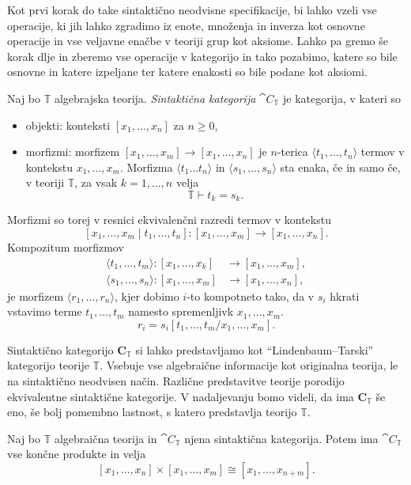 \documentclass[../kategoricna_logika.tex]{subfiles}
\begin{document}
Kot prvi korak do take sintaktično neodvisne specifikacije,
bi lahko vzeli vse operacije, ki jih lahko zgradimo iz
enote, množenja in inverza kot osnovne operacije in vse
veljavne enačbe v teoriji grup kot aksiome. Lahko pa gremo še korak dlje
in zberemo vse operacije v kategorijo in tako pozabimo, katere so bile
osnovne in katere izpeljane ter katere enakosti so bile podane kot aksiomi.
%
\begin{definicija}
  Naj bo $\mathbb{T}$ algebrajska teorija.
  \emph{Sintaktična kategorija} $\cat{C}_\mathbb{T}$ je kategorija,
  v kateri so
  \begin{itemize}
  \item objekti: konteksti $[x_1, \ldots, x_n]$ za $n \geq 0$,
%
  \item morfizmi: morfizem $[x_1, \ldots, x_m] \to [x_1, \ldots, x_n]$
    je $n$-terica $\langle t_1, \ldots, t_n \rangle$ termov v kontekstu
    $x_1, \ldots, x_m$. Morfizma $\langle t_1 \ldots t_n \rangle$ in
    $\langle s_1, \ldots, s_n \rangle$ sta enaka, če in samo če,
    v teoriji $\mathbb{T}$, za vsak $k = 1, \ldots, n$ velja
    $$\mathbb{T} \vdash t_k = s_k.$$
\end{itemize}
%
Morfizmi so torej v resnici ekvivalenčni razredi termov v kontekstu
$$[x_1, \ldots, x_m \mid t_1, \ldots, t_n] : [x_1, \ldots, x_m] \to [x_1, \ldots, x_n].$$
%
Kompozitum morfizmov
  \begin{align*}
    \langle t_1, \ldots, t_m \rangle : [x_1, \ldots, x_k] &\to [x_1, \ldots, x_m], \\
    \langle s_1, \ldots, s_n \rangle : [x_1, \ldots, x_m] &\to [x_1, \ldots, x_n],
  \end{align*}
je morfizem $\langle r_1, \ldots, r_n \rangle$, kjer dobimo $i$-to kompotneto tako,
da v $s_i$ hkrati vstavimo terme $t_1, \ldots, t_m$ namesto
spremenljivk $x_1, \ldots, x_m$.
$$r_i = s_i[t_1, \ldots, t_m / x_1, \ldots, x_m].$$
%
\end{definicija}
Sintaktično kategorijo $\mathbf{C}_{\mathbb{T}}$ si lahko predstavljamo kot
"`Lindenbaum--Tarski"' kategorijo teorije $\mathbb{T}$. Vsebuje vse algebraične
informacije kot originalna teorija, le na sintaktično neodvisen način.
Različne predstavitve teorije porodijo ekvivalentne sintaktične
kategorije. V nadaljevanju bomo videli, da ima $\mathbf{C}_{\mathbb{T}}$ še eno,
še bolj pomembno lastnost, s katero predstavlja teorijo $\mathbb{T}$.
%
\begin{lema}
  Naj bo $\mathbb{T}$ algebraična teorija in $\cat{C}_\mathbb{T}$
  njena sintaktična kategorija. Potem ima $\cat{C}_\mathbb{T}$ vse
  končne produkte in velja
$$[x_1, \ldots, x_n] \times [x_1, \ldots, x_m] \cong [x_1, \ldots, x_{n+m}].$$
\end{lema}
\end{document}
